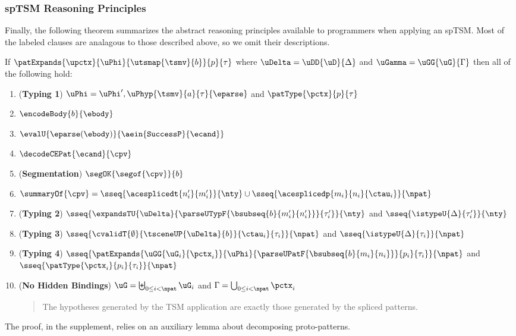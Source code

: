 \documentclass[acmlarge,review,anonymous]{acmart}\settopmatter{printfolios=true}
\begin{document}
\subsubsection{spTSM Reasoning Principles} Finally, the following theorem summarizes the abstract reasoning principles available to programmers when applying an spTSM. Most of the labeled clauses are analagous to those described above, so we omit their descriptions.
\begin{theorem}
If $\patExpands{\upctx}{\uPhi}{\utsmap{\tsmv}{b}}{p}{\tau}$ where $\uDelta=\uDD{\uD}{\Delta}$ and $\uGamma=\uGG{\uG}{\Gamma}$ then all of the following hold:
\begin{enumerate}
        \item (\textbf{Typing 1}) $\uPhi=\uPhi', \uPhyp{\tsmv}{a}{\tau}{\eparse}$ and $\patType{\pctx}{p}{\tau}$
        \item $\encodeBody{b}{\ebody}$
        \item $\evalU{\eparse(\ebody)}{\aein{\mathtt{SuccessP}}{\ecand}}$
        \item $\decodeCEPat{\ecand}{\cpv}$
        \item (\textbf{Segmentation}) $\segOK{\segof{\cpv}}{b}$
        \item $\summaryOf{\cpv} = \sseq{\acesplicedt{n'_i}{m'_i}}{\nty} \cup \sseq{\acesplicedp{m_i}{n_i}{\ctau_i}}{\npat}$
        \item (\textbf{Typing 2}) $\sseq{
              \expandsTU{\uDelta}
              {
                \parseUTypF{\bsubseq{b}{m'_i}{n'_i}}
              }{\tau'_i}
            }{\nty}$ and $\sseq{\istypeU{\Delta}{\tau'_i}}{\nty}$
        \item (\textbf{Typing 3}) $\sseq{
          \cvalidT{\emptyset}{
            \tsceneUP
              {\uDelta}{b}
          }{
            \ctau_i
          }{\tau_i}
        }{\npat}$ and $\sseq{\istypeU{\Delta}{\tau_i}}{\npat}$
        \item (\textbf{Typing 4}) $\sseq{
          \patExpands
            {\uGG{\uG_i}{\pctx_i}}
            {\uPhi}
            {\parseUPatF{\bsubseq{b}{m_i}{n_i}}}
            {p_i}
            {\tau_i}
        }{\npat}$  and $\sseq{\patType{\pctx_i}{p_i}{\tau_i}}{\npat}$
      \item (\textbf{No Hidden Bindings}) $\uG = \biguplus_{0 \leq i < \npat} \uG_i$ and $\Gamma = \bigcup_{0 \leq i < \npat} \pctx_i$
        \begin{quote}
          The hypotheses generated by the TSM application are exactly those generated by the spliced patterns.
        \end{quote}
\end{enumerate}
\end{theorem}
The proof, in the supplement, relies on an auxiliary lemma about decomposing proto-patterns.
\end{document}
